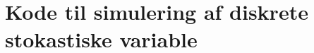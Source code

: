 \chapter{Kode til simulering af diskrete stokastiske variable} \label{app:kodeTilSimuleringAfDiskreteVariable}
